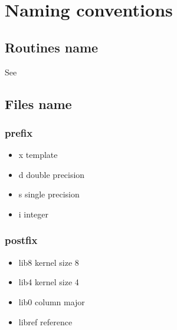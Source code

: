 \chapter{Naming conventions}


\section{Routines name}
See 

\section{Files name}

\subsection{prefix}
\begin{itemize}
\item x template
\item d double precision
\item s single precision
\item i integer
\end{itemize}


\subsection{postfix}
\begin{itemize}
\item lib8 kernel size 8
\item lib4 kernel size 4
\item lib0 column major
\item libref reference
\end{itemize}
